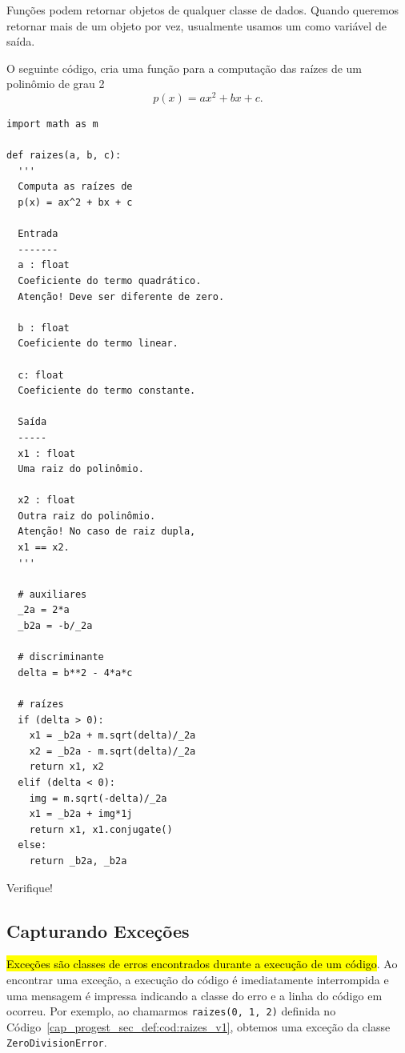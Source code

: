 Funções podem retornar objetos de qualquer classe de dados. Quando queremos retornar mais de um objeto por vez, usualmente usamos um {\PYTHONtuple} como variável de saída.

\begin{ex}
  O seguinte código, cria uma função para a computação das raízes de um polinômio de grau 2
  \begin{equation}
    p(x) = ax^2 + bx + c.
  \end{equation}

\begin{lstlisting}[caption=raizes\_v1.py, label=cap_progest_sec_def:cod:raizes_v1]
import math as m

def raizes(a, b, c):
  '''
  Computa as raízes de
  p(x) = ax^2 + bx + c

  Entrada
  -------
  a : float
  Coeficiente do termo quadrático.
  Atenção! Deve ser diferente de zero.

  b : float 
  Coeficiente do termo linear.

  c: float
  Coeficiente do termo constante.

  Saída
  -----
  x1 : float
  Uma raiz do polinômio.

  x2 : float
  Outra raiz do polinômio.
  Atenção! No caso de raiz dupla,
  x1 == x2.
  '''

  # auxiliares
  _2a = 2*a
  _b2a = -b/_2a

  # discriminante
  delta = b**2 - 4*a*c

  # raízes
  if (delta > 0):
    x1 = _b2a + m.sqrt(delta)/_2a
    x2 = _b2a - m.sqrt(delta)/_2a
    return x1, x2
  elif (delta < 0):
    img = m.sqrt(-delta)/_2a
    x1 = _b2a + img*1j
    return x1, x1.conjugate()
  else:
    return _b2a, _b2a
\end{lstlisting}
  
Verifique!
\end{ex}

\subsection{Capturando Exceções}

\hl{Exceções são classes de erros encontrados durante a execução de um código}. Ao encontrar uma exceção, a execução do código {\python} é imediatamente interrompida e uma mensagem é impressa indicando a classe do erro e a linha do código em ocorreu. Por exemplo, ao chamarmos \lstinline+raizes(0, 1, 2)+ definida no Código~\ref{cap_progest_sec_def:cod:raizes_v1}, obtemos uma exceção da classe \lstinline+ZeroDivisionError+.

